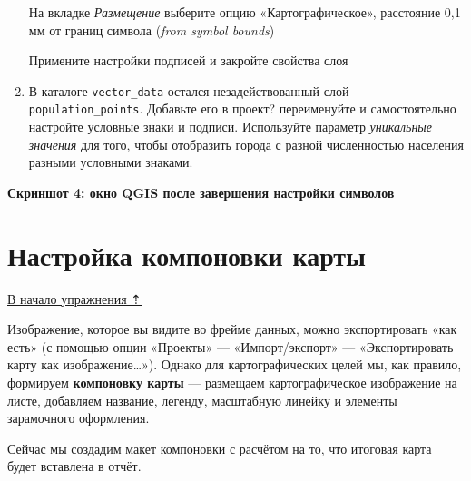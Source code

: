\documentclass[
  12pt,
]{book}
\begin{document}
\begin{enumerate}
  На вкладке \emph{Размещение} выберите опцию «Картографическое», расстояние 0,1 мм от границ символа (\emph{from symbol bounds})

  Примените настройки подписей и закройте свойства слоя
\item
  В каталоге \texttt{vector\_data} остался незадействованный слой --- \texttt{population\_points}. Добавьте его в проект? переименуйте и самостоятельно настройте условные знаки и подписи. Используйте параметр \emph{уникальные значения} для того, чтобы отобразить города с разной численностью населения разными условными знаками.
\end{enumerate}

\textbf{Скриншот 4: окно QGIS после завершения настройки символов}

\hypertarget{map-design-general-layout}{%
\section{Настройка компоновки карты}\label{map-design-general-layout}}

\protect\hyperlink{map-design-general}{В начало упражнения ⇡}

Изображение, которое вы видите во фрейме данных, можно экспортировать «как есть» (с помощью опции «Проекты» --- «Импорт/экспорт» --- «Экспортировать карту как изображение\ldots»). Однако для картографических целей мы, как правило, формируем \textbf{компоновку карты} --- размещаем картографическое изображение на листе, добавляем название, легенду, масштабную линейку и элементы зарамочного оформления.

Сейчас мы создадим макет компоновки с расчётом на то, что итоговая карта будет вставлена в отчёт.
\end{document}
